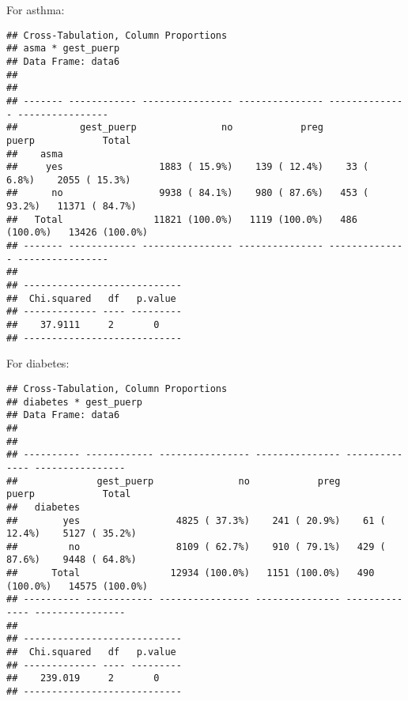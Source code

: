 \documentclass[
]{article}
\newenvironment{Shaded}{\begin{snugshade}}{\end{snugshade}}
\newcommand{\DataTypeTok}[1]{\textcolor[rgb]{0.13,0.29,0.53}{#1}}
\newcommand{\KeywordTok}[1]{\textcolor[rgb]{0.13,0.29,0.53}{\textbf{#1}}}
\newcommand{\NormalTok}[1]{#1}
\newcommand{\OperatorTok}[1]{\textcolor[rgb]{0.81,0.36,0.00}{\textbf{#1}}}
\newcommand{\OtherTok}[1]{\textcolor[rgb]{0.56,0.35,0.01}{#1}}
\newcommand{\StringTok}[1]{\textcolor[rgb]{0.31,0.60,0.02}{#1}}
\begin{document}
For asthma:

\begin{Shaded}
\end{Shaded}

\begin{verbatim}
## Cross-Tabulation, Column Proportions  
## asma * gest_puerp  
## Data Frame: data6  
## 
## 
## ------- ------------ ---------------- --------------- -------------- ----------------
##           gest_puerp               no            preg          puerp            Total
##    asma                                                                              
##     yes                 1883 ( 15.9%)    139 ( 12.4%)    33 (  6.8%)    2055 ( 15.3%)
##      no                 9938 ( 84.1%)    980 ( 87.6%)   453 ( 93.2%)   11371 ( 84.7%)
##   Total                11821 (100.0%)   1119 (100.0%)   486 (100.0%)   13426 (100.0%)
## ------- ------------ ---------------- --------------- -------------- ----------------
## 
## ----------------------------
##  Chi.squared   df   p.value 
## ------------- ---- ---------
##    37.9111     2       0    
## ----------------------------
\end{verbatim}

For diabetes:

\begin{Shaded}
\end{Shaded}

\begin{verbatim}
## Cross-Tabulation, Column Proportions  
## diabetes * gest_puerp  
## Data Frame: data6  
## 
## 
## ---------- ------------ ---------------- --------------- -------------- ----------------
##              gest_puerp               no            preg          puerp            Total
##   diabetes                                                                              
##        yes                 4825 ( 37.3%)    241 ( 20.9%)    61 ( 12.4%)    5127 ( 35.2%)
##         no                 8109 ( 62.7%)    910 ( 79.1%)   429 ( 87.6%)    9448 ( 64.8%)
##      Total                12934 (100.0%)   1151 (100.0%)   490 (100.0%)   14575 (100.0%)
## ---------- ------------ ---------------- --------------- -------------- ----------------
## 
## ----------------------------
##  Chi.squared   df   p.value 
## ------------- ---- ---------
##    239.019     2       0    
## ----------------------------
\end{verbatim}
\end{document}
